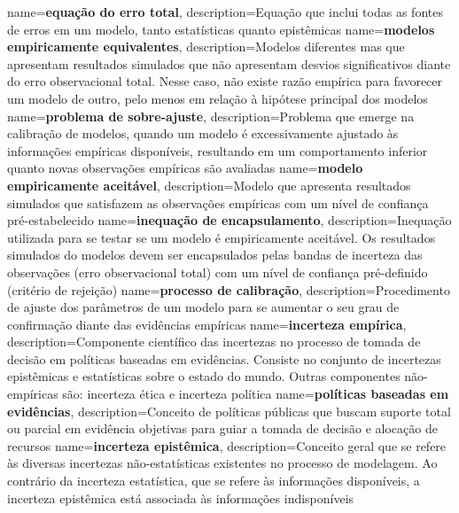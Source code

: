 {
    name=\textbf{equação do erro total},
    description={Equação que inclui todas as fontes de erros em um modelo, tanto estatísticas quanto epistêmicas}
}
{
    name=\textbf{modelos empiricamente equivalentes},
    description={Modelos diferentes mas que apresentam resultados simulados que não apresentam desvios significativos diante do erro observacional total. Nesse caso, não existe razão empírica para favorecer um modelo de outro, pelo menos em relação à hipótese principal dos modelos}
}
{
    name=\textbf{problema de sobre-ajuste},
    description={Problema que emerge na calibração de modelos, quando um modelo é excessivamente ajustado às informações empíricas disponíveis, resultando em um comportamento inferior quanto novas observações empíricas são avaliadas}
}
{
    name=\textbf{modelo empiricamente aceitável},
    description={Modelo que apresenta resultados simulados que satisfazem as observações empíricas com um nível de confiança pré-estabelecido}
}
{
    name=\textbf{inequação de encapsulamento},
    description={Inequação utilizada para se testar se um modelo é empiricamente aceitável. Os resultados simulados do modelos devem ser encapsulados pelas bandas de incerteza das observações (erro observacional total) com um nível de confiança pré-definido (critério de rejeição)}
}
{
    name=\textbf{processo de calibração},
    description={Procedimento de ajuste dos parâmetros de um modelo para se aumentar o seu grau de confirmação diante das evidências empíricas}
}
{
    name=\textbf{incerteza empírica},
    description={Componente científico das incertezas no processo de tomada de decisão em políticas baseadas em evidências. Consiste no conjunto de incertezas epistêmicas e estatísticas sobre o estado do mundo. Outras componentes não-empíricas são: incerteza ética e incerteza política}
}
{
    name=\textbf{políticas baseadas em evidências},
    description={Conceito de políticas públicas que buscam suporte total ou parcial em evidência objetivas para guiar a tomada de decisão e alocação de recursos}
}
{
    name=\textbf{incerteza epistêmica},
    description={Conceito geral que se refere às diversas incertezas não-estatísticas existentes no processo de modelagem. Ao contrário da incerteza estatística, que se refere às informações disponíveis, a incerteza epistêmica está associada às informações indisponíveis}
}
